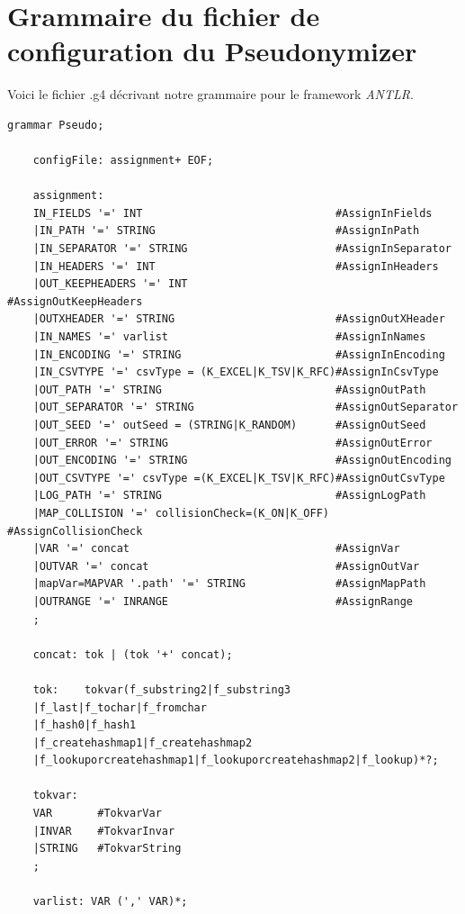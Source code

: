 \documentclass[12pt]{report}
\begin{document}
	\section{Grammaire du fichier de configuration du Pseudonymizer}
	\label{sec:grammaire}
	Voici le fichier .g4 décrivant notre grammaire pour le framework \textit{ANTLR}.
	\noindent
	\begin{lstlisting}[style=py, gobble=1]
	grammar Pseudo;
	
	configFile: assignment+ EOF;
	
	assignment:      
	IN_FIELDS '=' INT                              #AssignInFields
	|IN_PATH '=' STRING                            #AssignInPath
	|IN_SEPARATOR '=' STRING                       #AssignInSeparator
	|IN_HEADERS '=' INT                            #AssignInHeaders
	|OUT_KEEPHEADERS '=' INT                       #AssignOutKeepHeaders
	|OUTXHEADER '=' STRING                         #AssignOutXHeader
	|IN_NAMES '=' varlist                          #AssignInNames
	|IN_ENCODING '=' STRING                        #AssignInEncoding
	|IN_CSVTYPE '=' csvType = (K_EXCEL|K_TSV|K_RFC)#AssignInCsvType
	|OUT_PATH '=' STRING                           #AssignOutPath
	|OUT_SEPARATOR '=' STRING                      #AssignOutSeparator
	|OUT_SEED '=' outSeed = (STRING|K_RANDOM)      #AssignOutSeed
	|OUT_ERROR '=' STRING                          #AssignOutError
	|OUT_ENCODING '=' STRING                       #AssignOutEncoding
	|OUT_CSVTYPE '=' csvType =(K_EXCEL|K_TSV|K_RFC)#AssignOutCsvType
	|LOG_PATH '=' STRING                           #AssignLogPath
	|MAP_COLLISION '=' collisionCheck=(K_ON|K_OFF) #AssignCollisionCheck
	|VAR '=' concat                                #AssignVar
	|OUTVAR '=' concat                             #AssignOutVar
	|mapVar=MAPVAR '.path' '=' STRING              #AssignMapPath
	|OUTRANGE '=' INRANGE                          #AssignRange
	; 
	
	concat: tok | (tok '+' concat); 
	
	tok:    tokvar(f_substring2|f_substring3
	|f_last|f_tochar|f_fromchar
	|f_hash0|f_hash1
	|f_createhashmap1|f_createhashmap2
	|f_lookuporcreatehashmap1|f_lookuporcreatehashmap2|f_lookup)*?;
	
	tokvar: 
	VAR       #TokvarVar 
	|INVAR    #TokvarInvar
	|STRING   #TokvarString
	;
	
	varlist: VAR (',' VAR)*;
	

\end{lstlisting}
\end{document}
